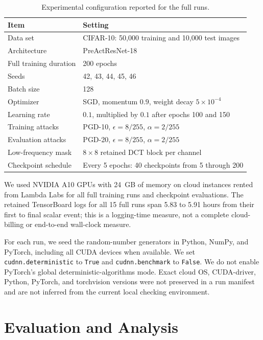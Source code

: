 \documentclass[11pt]{article}
\begin{document}
\begin{table}[htbp]
\centering
\caption{Experimental configuration reported for the full runs.}
\label{tab:configuration}
\begin{tabularx}{\linewidth}{@{}lX@{}}
\toprule
Item & Setting \\
\midrule
Data set & CIFAR-10: 50,000 training and 10,000 test images \\
Architecture & PreActResNet-18 \\
Full training duration & 200 epochs \\
Seeds & 42, 43, 44, 45, 46 \\
Batch size & 128 \\
Optimizer & SGD, momentum $0.9$, weight decay $5\times10^{-4}$ \\
Learning rate & $0.1$, multiplied by $0.1$ after epochs 100 and 150 \\
Training attacks & PGD-10, $\epsilon=8/255$, $\alpha=2/255$ \\
Evaluation attacks & PGD-20, $\epsilon=8/255$, $\alpha=2/255$ \\
Low-frequency mask & $8\times8$ retained DCT block per channel \\
Checkpoint schedule & Every 5 epochs: 40 checkpoints from 5 through 200 \\
\bottomrule
\end{tabularx}
\end{table}
\FloatBarrier

We used NVIDIA A10 GPUs with 24~GB of memory on cloud instances rented from
Lambda Labs for all full training runs and checkpoint evaluations. The retained TensorBoard logs for all 15 full runs
span 5.83 to 5.91 hours from their first to final scalar event; this is a
logging-time measure, not a complete cloud-billing or end-to-end wall-clock
measure.

For each run, we seed the random-number generators in Python, NumPy, and
PyTorch, including all CUDA devices when available. We set
\texttt{cudnn.deterministic} to \texttt{True} and \texttt{cudnn.benchmark}
to \texttt{False}. We do not enable PyTorch's global
deterministic-algorithms mode. Exact cloud OS, CUDA-driver, Python, PyTorch,
and torchvision versions were not preserved in a run manifest and are not
inferred from the current local checking environment.

\section{Evaluation and Analysis}
\label{sec:analysis-plan}
\end{document}

